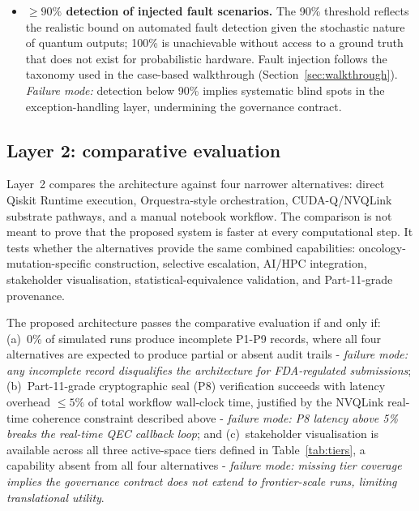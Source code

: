 \documentclass[11pt,letterpaper]{article}
\begin{document}
\begin{itemize}[leftmargin=1.5em,itemsep=4pt]
\item \textbf{$\geq 90\%$ detection of injected fault scenarios.}\;
The 90\% threshold reflects the realistic bound on automated fault detection given the
stochastic nature of quantum outputs; 100\% is unachievable without access to a ground
truth that does not exist for probabilistic hardware.  Fault injection follows the taxonomy
used in the case-based walkthrough (Section~\ref{sec:walkthrough}).
\textit{Failure mode:} detection below 90\% implies systematic blind spots in the
exception-handling layer, undermining the governance contract.

\end{itemize}

\subsection{Layer 2: comparative evaluation}

Layer~2 compares the architecture against four narrower alternatives: direct Qiskit Runtime
execution, Orquestra-style orchestration, CUDA-Q/NVQLink substrate pathways, and a manual
notebook workflow.  The comparison is not meant to prove that the proposed system is faster
at every computational step.  It tests whether the alternatives provide the same combined
capabilities: oncology-mutation-specific construction, selective escalation, AI/HPC
integration, stakeholder visualisation, statistical-equivalence validation, and
Part-11-grade provenance.

The proposed architecture passes the comparative evaluation if and only if: (a)~0\% of
simulated runs produce incomplete P1-P9 records, where all four alternatives are expected
to produce partial or absent audit trails - \textit{failure mode: any incomplete record
disqualifies the architecture for FDA-regulated submissions}; (b)~Part-11-grade
cryptographic seal (P8) verification succeeds with latency overhead $\leq 5\%$ of total
workflow wall-clock time, justified by the NVQLink real-time coherence constraint described
above - \textit{failure mode: P8 latency above 5\% breaks the real-time QEC callback loop};
and (c)~stakeholder visualisation is available across all three active-space tiers defined
in Table~\ref{tab:tiers}, a capability absent from all four alternatives - \textit{failure
mode: missing tier coverage implies the governance contract does not extend to
frontier-scale runs, limiting translational utility}.
\end{document}
